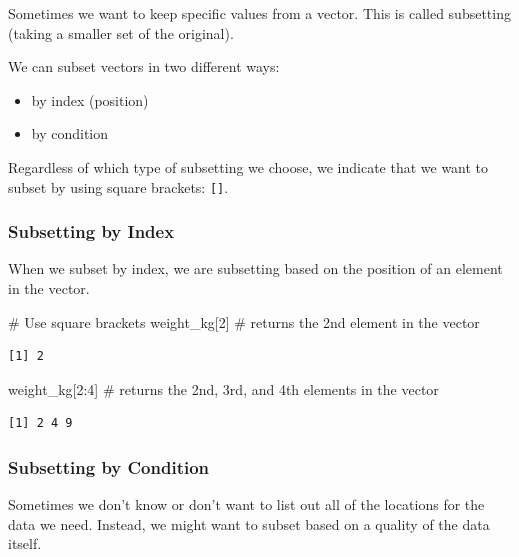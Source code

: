 \documentclass[
  letterpaper,
  DIV=11,
  numbers=noendperiod]{scrartcl}
\newenvironment{Shaded}{\begin{snugshade}}{\end{snugshade}}
\newcommand{\CommentTok}[1]{\textcolor[rgb]{0.37,0.37,0.37}{#1}}
\newcommand{\DecValTok}[1]{\textcolor[rgb]{0.68,0.00,0.00}{#1}}
\newcommand{\NormalTok}[1]{\textcolor[rgb]{0.00,0.23,0.31}{#1}}
\newcommand{\SpecialCharTok}[1]{\textcolor[rgb]{0.37,0.37,0.37}{#1}}
\providecommand{\tightlist}{%
  \setlength{\itemsep}{0pt}\setlength{\parskip}{0pt}}
\begin{document}
Sometimes we want to keep specific values from a vector. This is called
subsetting (taking a smaller set of the original).

We can subset vectors in two different ways:

\begin{itemize}
\tightlist
\item
  by index (position)
\item
  by condition
\end{itemize}

Regardless of which type of subsetting we choose, we indicate that we
want to subset by using square brackets: \texttt{{[}{]}}.

\subsubsection{Subsetting by Index}\label{subsetting-by-index}

When we subset by index, we are subsetting based on the position of an
element in the vector.

\begin{Shaded}
\begin{Highlighting}[]
\CommentTok{\# Use square brackets}
\NormalTok{weight\_kg[}\DecValTok{2}\NormalTok{]    }\CommentTok{\# returns the 2nd element in the vector}
\end{Highlighting}
\end{Shaded}

\begin{verbatim}
[1] 2
\end{verbatim}

\begin{Shaded}
\begin{Highlighting}[]
\NormalTok{weight\_kg[}\DecValTok{2}\SpecialCharTok{:}\DecValTok{4}\NormalTok{]  }\CommentTok{\# returns the 2nd, 3rd, and 4th elements in the vector}
\end{Highlighting}
\end{Shaded}

\begin{verbatim}
[1] 2 4 9
\end{verbatim}

\subsubsection{Subsetting by Condition}\label{subsetting-by-condition}

Sometimes we don't know or don't want to list out all of the locations
for the data we need. Instead, we might want to subset based on a
quality of the data itself.
\end{document}
